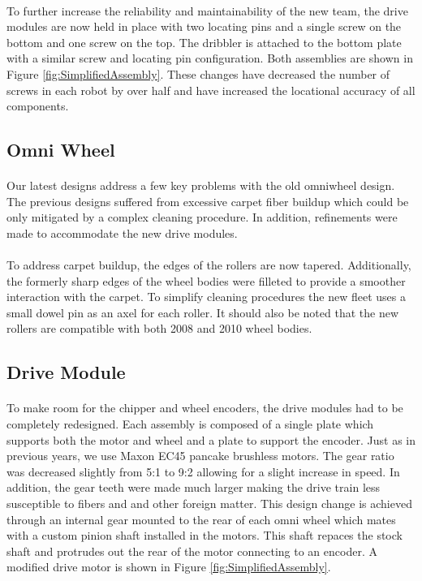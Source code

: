 \documentclass{llncs}
\begin{document}
\paragraph{}
To further increase the reliability and maintainability of the new team, the drive modules are now held in place with two locating pins and a single screw on the bottom and one screw on the top. The dribbler is attached to the bottom plate with a similar screw and locating pin configuration. Both assemblies are shown in Figure \ref{fig:SimplifiedAssembly}. These changes have decreased the number of screws in each robot by over half and have increased the locational accuracy of all components.

\subsection{Omni Wheel}
\paragraph{}
Our latest designs address a few key problems with the old omniwheel design. The previous designs suffered from excessive carpet fiber buildup which could be only mitigated by a complex cleaning procedure. In addition, refinements were made to accommodate the new drive modules.
\paragraph{}
To address carpet buildup, the edges of the rollers are now tapered. Additionally, the formerly sharp edges of the wheel bodies were filleted to provide a smoother interaction with the carpet. To simplify cleaning procedures the new fleet uses a small dowel pin as an axel for each roller. It should also be noted that the new rollers are compatible with both 2008 and 2010 wheel bodies.

\subsection{Drive Module}
\paragraph{}
To make room for the chipper and wheel encoders, the drive modules had to be completely redesigned. Each assembly is composed of a single plate which supports both the motor and wheel and a plate to support the encoder. Just as in previous years, we use Maxon EC45 pancake brushless motors. The gear ratio was decreased slightly from 5:1 to 9:2 allowing for a slight increase in speed. In addition, the gear teeth were made much larger making the drive train less susceptible to fibers and and other foreign matter. This design change is achieved through an internal gear mounted to the rear of each omni wheel which mates with a custom pinion shaft installed in the motors. This shaft repaces the stock shaft and protrudes out the rear of the motor connecting to an encoder. A modified drive motor is shown in Figure \ref{fig:SimplifiedAssembly}. 
\end{document}
